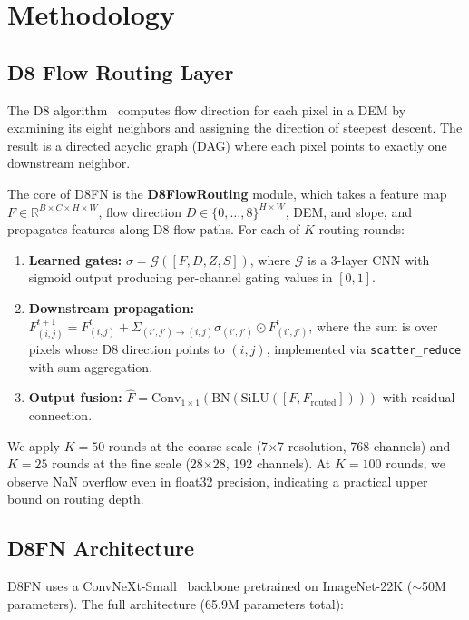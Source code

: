 \documentclass[journal]{IEEEtran}
\begin{document}
\section{Methodology}

\subsection{D8 Flow Routing Layer}
The D8 algorithm~\cite{d8} computes flow direction for each pixel in a DEM by examining its eight neighbors and assigning the direction of steepest descent. The result is a directed acyclic graph (DAG) where each pixel points to exactly one downstream neighbor.

The core of D8FN is the \textbf{D8FlowRouting} module, which takes a feature map $F \in \mathbb{R}^{B \times C \times H \times W}$, flow direction $D \in \{0,\dots,8\}^{H \times W}$, DEM, and slope, and propagates features along D8 flow paths. For each of $K$ routing rounds:

\begin{enumerate}
    \item \textbf{Learned gates:} $\sigma = \mathcal{G}([F, D, Z, S])$, where $\mathcal{G}$ is a 3-layer CNN with sigmoid output producing per-channel gating values in $[0,1]$.
    \item \textbf{Downstream propagation:} $F^{t+1}_{(i,j)} = F^{t}_{(i,j)} + \Sigma_{(i',j')\to(i,j)} \sigma_{(i',j')} \odot F^{t}_{(i',j')}$, where the sum is over pixels whose D8 direction points to $(i,j)$, implemented via \texttt{scatter\_reduce} with sum aggregation.
    \item \textbf{Output fusion:} $\hat{F} = \text{Conv}_{1\times1}(\text{BN}(\text{SiLU}([F, F_{\text{routed}}])))$ with residual connection.
\end{enumerate}

We apply $K=50$ rounds at the coarse scale (7$\times$7 resolution, 768 channels) and $K=25$ rounds at the fine scale (28$\times$28, 192 channels). At $K=100$ rounds, we observe NaN overflow even in float32 precision, indicating a practical upper bound on routing depth.

\subsection{D8FN Architecture}
D8FN uses a ConvNeXt-Small~\cite{convnext} backbone pretrained on ImageNet-22K ($\sim$50M parameters). The full architecture (65.9M parameters total):
\end{document}

